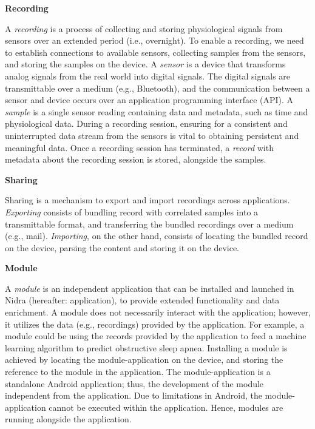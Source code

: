 
\noindent\textbf{Recording}

\noindent A \textit{recording} is a process of collecting and storing physiological signals from sensors over an extended period (i.e., overnight). To enable a recording, we need to establish connections to available sensors, collecting samples from the sensors, and storing the samples on the device. A \textit{sensor} is a device that transforms analog signals from the real world into digital signals. The digital signals are transmittable over a medium (e.g., Bluetooth), and the communication between a sensor and device occurs over an application programming interface (API). A \textit{sample} is a single sensor reading containing data and metadata, such as time and physiological data. During a recording session, ensuring for a consistent and uninterrupted data stream from the sensors is vital to obtaining persistent and meaningful data.  Once a recording session has terminated, a \textit{record} with metadata about the recording session is stored, alongside the samples.    

\noindent \textbf{Sharing}

\noindent Sharing is a mechanism to export and import recordings across applications. \textit{Exporting} consists of bundling record with correlated samples into a transmittable format, and transferring the bundled recordings over a medium (e.g., mail). \textit{Importing}, on the other hand, consists of locating the bundled record on the device, parsing the content and storing it on the device.  

\noindent \textbf{Module}

\noindent A \textit{module} is an independent application that can be installed and launched in Nidra (hereafter: application), to provide extended functionality and data enrichment. A module does not necessarily interact with the application; however, it utilizes the data (e.g., recordings) provided by the application. For example, a module could be using the records provided by the application to feed a machine learning algorithm to predict obstructive sleep apnea. Installing a module is achieved by locating the module-application on the device, and storing the reference to the module in the application. The module-application is a standalone Android application; thus, the development of the module independent from the application. Due to limitations in Android, the module-application cannot be executed within the application. Hence, modules are running alongside the application.

